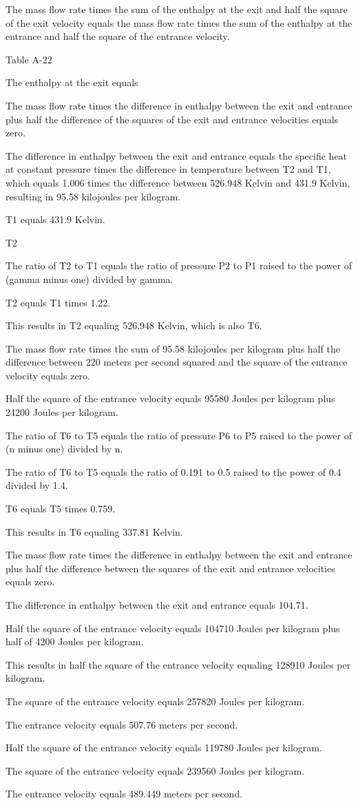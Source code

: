 The mass flow rate times the sum of the enthalpy at the exit and half the square of the exit velocity equals the mass flow rate times the sum of the enthalpy at the entrance and half the square of the entrance velocity.

Table A-22

The enthalpy at the exit equals

The mass flow rate times the difference in enthalpy between the exit and entrance plus half the difference of the squares of the exit and entrance velocities equals zero.

The difference in enthalpy between the exit and entrance equals the specific heat at constant pressure times the difference in temperature between T2 and T1, which equals 1.006 times the difference between 526.948 Kelvin and 431.9 Kelvin, resulting in 95.58 kilojoules per kilogram.

T1 equals 431.9 Kelvin.

T2

The ratio of T2 to T1 equals the ratio of pressure P2 to P1 raised to the power of (gamma minus one) divided by gamma.

T2 equals T1 times 1.22.

This results in T2 equaling 526.948 Kelvin, which is also T6.

The mass flow rate times the sum of 95.58 kilojoules per kilogram plus half the difference between 220 meters per second squared and the square of the entrance velocity equals zero.

Half the square of the entrance velocity equals 95580 Joules per kilogram plus 24200 Joules per kilogram.

The ratio of T6 to T5 equals the ratio of pressure P6 to P5 raised to the power of (n minus one) divided by n.

The ratio of T6 to T5 equals the ratio of 0.191 to 0.5 raised to the power of 0.4 divided by 1.4.

T6 equals T5 times 0.759.

This results in T6 equaling 337.81 Kelvin.

The mass flow rate times the difference in enthalpy between the exit and entrance plus half the difference between the squares of the exit and entrance velocities equals zero.

The difference in enthalpy between the exit and entrance equals 104.71.

Half the square of the entrance velocity equals 104710 Joules per kilogram plus half of 4200 Joules per kilogram.

This results in half the square of the entrance velocity equaling 128910 Joules per kilogram.

The square of the entrance velocity equals 257820 Joules per kilogram.

The entrance velocity equals 507.76 meters per second.

Half the square of the entrance velocity equals 119780 Joules per kilogram.

The square of the entrance velocity equals 239560 Joules per kilogram.

The entrance velocity equals 489.449 meters per second.